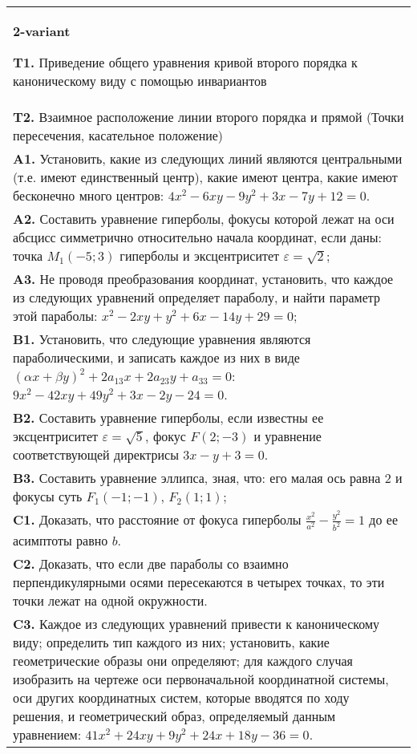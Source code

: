 \documentclass{article}
\begin{document}
\begin{tabular}{m{17cm}}
\textbf{2-variant}
\newline

\textbf{T1.} Приведение общего уравнения кривой второго порядка к каноническому виду с помощью инвариантов \\
\textbf{T2.} Взаимное расположение линии второго порядка и прямой (Точки пересечения, касательное положение) \\
\textbf{A1.} Установить, какие из следующих линий являются центральными (т.е. имеют единственный центр), какие имеют центра, какие имеют бесконечно много центров: $4 x^2-6 x y-9 y^2+3 x-7 y+12=0$. \\
\textbf{A2.} Составить уравнение гиперболы, фокусы которой лежат на оси абсцисс симметрично относительно начала координат, если даны: точка $M_1(-5 ; 3)$ гиперболы и эксцентриситет $\varepsilon=\sqrt{2}$; \\
\textbf{A3.} Не проводя преобразования координат, установить, что каждое из следующих уравнений определяет параболу, и найти параметр этой параболы: $x^2-2 x y+y^2+6 x-14 y+29=0$; \\
\textbf{B1.} Установить, что следующие уравнения являются параболическими, и записать каждое из них в виде $(\alpha x+\beta y)^2+2 a_{13} x+2 a_{23} y+a_{33}=0$: $9 x^2-42 x y+49 y^2+3 x-2 y-24=0$. \\
\textbf{B2.} Составить уравнение гиперболы, если известны ее эксцентриситет $\varepsilon=\sqrt{5}$, фокус $F(2 ;-3)$ и уравнение соответствующей директрисы $3 x-y+3=0$. \\
\textbf{B3.} Составить уравнение эллипса, зная, что: его малая ось равна 2 и фокусы суть $F_1(-1 ;-1)$, $F_2(1 ; 1)$; \\
\textbf{C1.} Доказать, что расстояние от фокуса гиперболы $\frac{x^2}{a^2}-\frac{y^2}{b^2}=1$ до ее асимптоты равно $b$. \\
\textbf{C2.} Доказать, что если две параболы со взаимно перпендикулярными осями пересекаются в четырех точках, то эти точки лежат на одной окружности. \\
\textbf{C3.} Каждое из следующих уравнений привести к каноническому виду; определить тип каждого из них; установить, какие геометрические образы они определяют; для каждого случая изобразить на чертеже оси первоначальной координатной системы, оси других координатных систем, которые вводятся по ходу решения, и геометрический образ, определяемый данным уравнением: $41 x^2+24 x y+9 y^2+24 x+18 y-36=0$. \\

\end{tabular}
\vspace{1cm}
\end{document}
